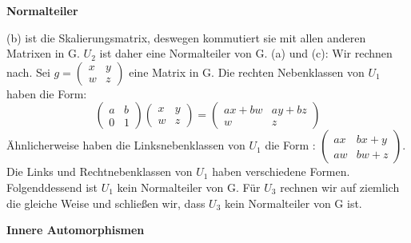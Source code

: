 \documentclass{homework}
\begin{document}
\begin{problem}
    \textbf{Normalteiler}
\end{problem}

\begin{solution}
(b) ist die Skalierungsmatrix, deswegen kommutiert sie mit allen anderen Matrixen in G. $U_2$ ist daher eine Normalteiler von G. \newline
(a) und (c):
Wir rechnen nach. Sei $g = \begin{pmatrix}
    x & y \\
    w & z
\end{pmatrix}$ eine Matrix in G. \newline
Die rechten Nebenklassen von $U_1$ haben die Form:
$$
    \begin{pmatrix}
        a & b \\
        0 & 1
    \end{pmatrix}
    \begin{pmatrix}
        x & y \\
        w & z
    \end{pmatrix}
    =
    \begin{pmatrix}
        ax+bw & ay+bz \\
        w & z
    \end{pmatrix}
$$
Ähnlicherweise haben die Linksnebenklassen von $U_1$ die Form : $\begin{pmatrix}
    ax & bx+y \\
    aw & bw+z
\end{pmatrix}$.
Die Links und Rechtnebenklassen von $U_1$ haben verschiedene Formen. Folgenddessend ist $U_1$ kein Normalteiler von G.
Für $U_3$ rechnen wir auf ziemlich die gleiche Weise und schließen wir, dass $U_3$ kein Normalteiler von G ist.
\end{solution}

\begin{problem}
    \textbf{Innere Automorphismen}
\end{problem}
\end{document}
